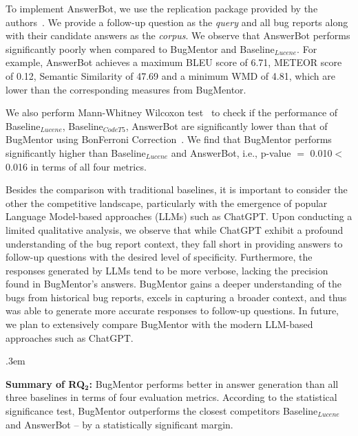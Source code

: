 To implement AnswerBot, we use the replication package provided by the authors~\cite{xu2017answerbot, maxxbw54}. We provide a follow-up question as the \emph{query} and all bug reports along with their candidate answers as the \emph{corpus}. We observe that AnswerBot performs significantly poorly when compared to BugMentor and  Baseline$_{Lucene}$. For example, AnswerBot achieves a maximum BLEU score of 6.71, METEOR score of 0.12, Semantic Similarity of 47.69 and a minimum WMD of 4.81, which are lower than the corresponding measures from BugMentor.\par


We also perform Mann-Whitney Wilcoxon test~\cite{cuzick1985wilcoxon} to check if the performance of Baseline$_{Lucene}$, Baseline$_{CodeT5}$, AnswerBot are significantly lower than that of BugMentor using BonFerroni Correction~\cite{weisstein2004bonferroni}. We find that BugMentor performs significantly higher than Baseline$_{Lucene}$ and AnswerBot, i.e., p-value $=$ 0.010$<$0.016 in terms of all four metrics.\par

Besides the comparison with traditional baselines, it is important to consider the other the competitive landscape, particularly with the emergence of popular Language Model-based approaches (LLMs) such as ChatGPT. Upon conducting a limited qualitative analysis, we observe that while ChatGPT exhibit a profound understanding of the bug report context, they fall short in providing answers to follow-up questions with the desired level of specificity. Furthermore, the responses generated by LLMs tend to be more verbose, lacking the precision found in BugMentor's answers. BugMentor gains a deeper understanding of the bugs from historical bug reports, excels in capturing a broader context, and thus was able to generate more accurate responses to follow-up questions. In future, we plan to extensively compare BugMentor with the modern LLM-based approaches such as ChatGPT.

\FrameSep.3em
\begin{frshaded}
	\noindent
	\textbf{Summary of RQ$\mathbf{_2}$:} BugMentor performs better in answer generation than all three baselines in terms of four evaluation metrics. According to the statistical significance test, BugMentor outperforms the closest competitors Baseline$_{Lucene}$ and AnswerBot  – by a statistically significant margin.
\end{frshaded} 




